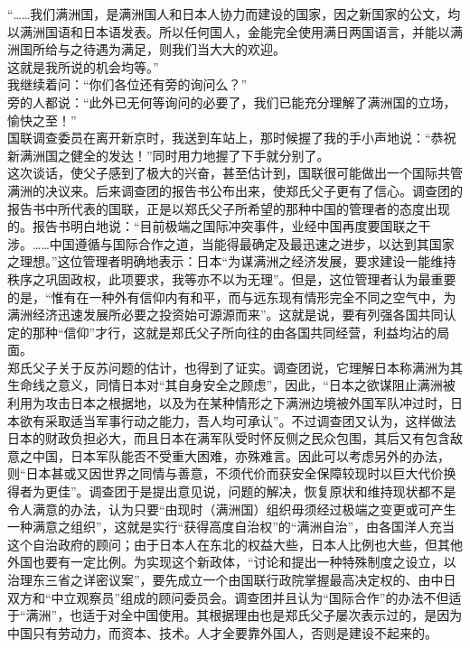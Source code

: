“……我们满洲国，是满洲国人和日本人协力而建设的国家，因之新国家的公文，均以满洲国语和日本语发表。所以任何国人，金能完全使用满日两国语言，并能以满洲国所给与之待遇为满足，则我们当大大的欢迎。\\

这就是我所说的机会均等。”\\

我继续着问：“你们各位还有旁的询问么？”\\

旁的人都说：“此外已无何等询问的必要了，我们已能充分理解了满洲国的立场，愉快之至！”\\

国联调查委员在离开新京时，我送到车站上，那时候握了我的手小声地说：“恭祝新满洲国之健全的发达！”同时用力地握了下手就分别了。\\

这次谈话，使父子感到了极大的兴奋，甚至估计到，国联很可能做出一个国际共管满洲的决议来。后来调查团的报告书公布出来，使郑氏父子更有了信心。调查团的报告书中所代表的国联，正是以郑氏父子所希望的那种中国的管理者的态度出现的。报告书明白地说：“目前极端之国际冲突事件，业经中国再度要国联之干涉。……中国遵循与国际合作之道，当能得最确定及最迅速之进步，以达到其国家之理想。”这位管理者明确地表示：日本“为谋满洲之经济发展，要求建设一能维持秩序之巩固政权，此项要求，我等亦不以为无理”。但是，这位管理者认为最重要的是，“惟有在一种外有信仰内有和平，而与远东现有情形完全不同之空气中，为满洲经济迅速发展所必要之投资始可源源而来”。这就是说，要有列强各国共同认定的那种“信仰”才行，这就是郑氏父子所向往的由各国共同经营，利益均沾的局面。\\

郑氏父子关于反苏问题的估计，也得到了证实。调查团说，它理解日本称满洲为其生命线之意义，同情日本对“其自身安全之顾虑”，因此，“日本之欲谋阻止满洲被利用为攻击日本之根据地，以及为在某种情形之下满洲边境被外国军队冲过时，日本欲有采取适当军事行动之能力，吾人均可承认”。不过调查团又认为，这样做法日本的财政负担必大，而且日本在满军队受时怀反侧之民众包围，其后又有包含敌意之中国，日本军队能否不受重大困难，亦殊难言。因此可以考虑另外的办法，则“日本甚或又因世界之同情与善意，不须代价而获安全保障较现时以巨大代价换得者为更佳”。调查团于是提出意见说，问题的解决，恢复原状和维持现状都不是令人满意的办法，认为只要“由现时（满洲国）组织毋须经过极端之变更或可产生一种满意之组织”，这就是实行“获得高度自治权”的“满洲自治”，由各国洋人充当这个自治政府的顾问；由于日本人在东北的权益大些，日本人比例也大些，但其他外国也要有一定比例。为实现这个新政体，“讨论和提出一种特殊制度之设立，以治理东三省之详密议案”，要先成立一个由国联行政院掌握最高决定权的、由中日双方和“中立观察员”组成的顾问委员会。调查团并且认为“国际合作”的办法不但适于“满洲”，也适于对全中国使用。其根据理由也是郑氏父子屡次表示过的，是因为中国只有劳动力，而资本、技术。人才全要靠外国人，否则是建设不起来的。\\


